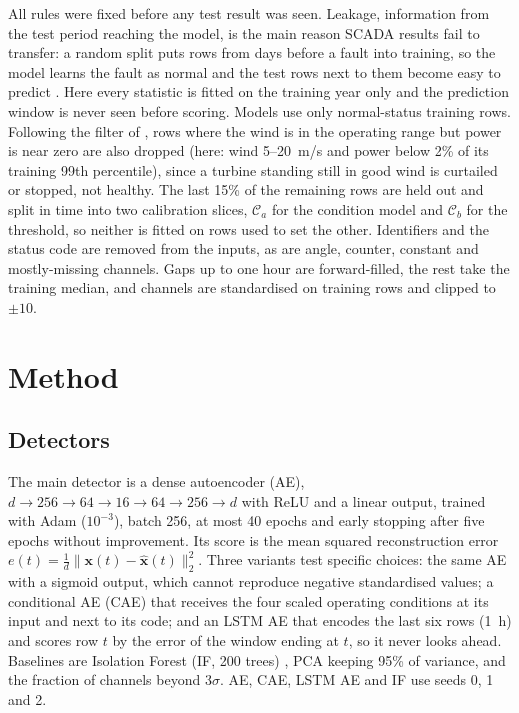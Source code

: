 \documentclass[conference]{IEEEtran}
\begin{document}
All rules were fixed before any test result was seen. Leakage, information from the test period reaching the model, is the main reason SCADA results fail to transfer: a random split puts rows from days before a fault into training, so the model learns the fault as normal and the test rows next to them become easy to predict \cite{r28}. Here every statistic is fitted on the training year only and the prediction window is never seen before scoring. Models use only normal-status training rows. Following the filter of \cite{r12}, rows where the wind is in the operating range but power is near zero are also dropped (here: wind 5--20~m/s and power below 2\% of its training 99th percentile), since a turbine standing still in good wind is curtailed or stopped, not healthy. The last 15\% of the remaining rows are held out and split in time into two calibration slices, $\mathcal{C}_a$ for the condition model and $\mathcal{C}_b$ for the threshold, so neither is fitted on rows used to set the other. Identifiers and the status code are removed from the inputs, as are angle, counter, constant and mostly-missing channels. Gaps up to one hour are forward-filled, the rest take the training median, and channels are standardised on training rows and clipped to $\pm10$.

\section{Method}
\subsection{Detectors}
The main detector is a dense autoencoder (AE), $d\!\to\!256\!\to\!64\!\to\!16\!\to\!64\!\to\!256\!\to\!d$ with ReLU and a linear output, trained with Adam ($10^{-3}$), batch 256, at most 40 epochs and early stopping after five epochs without improvement. Its score is the mean squared reconstruction error $e(t)=\tfrac{1}{d}\lVert \mathbf{x}(t)-\hat{\mathbf{x}}(t)\rVert_2^2$. Three variants test specific choices: the same AE with a sigmoid output, which cannot reproduce negative standardised values; a conditional AE (CAE) that receives the four scaled operating conditions at its input and next to its code; and an LSTM AE that encodes the last six rows (1~h) and scores row $t$ by the error of the window ending at $t$, so it never looks ahead. Baselines are Isolation Forest (IF, 200 trees) \cite{r16}, PCA keeping 95\% of variance, and the fraction of channels beyond 3$\sigma$. AE, CAE, LSTM AE and IF use seeds 0, 1 and 2.
\end{document}
